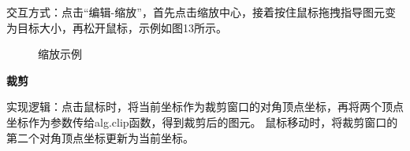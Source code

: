 \documentclass[a4paper,UTF8]{article}
\theoremstyle{definition}
\begin{document}
交互方式：点击“编辑-缩放”，首先点击缩放中心，接着按住鼠标拖拽指导图元变为目标大小，再松开鼠标，示例如图13所示。
\begin{figure}[H]
    \centering
        \caption{缩放示例}
        \label{fig:1}
\end{figure}

\textbf{裁剪}

实现逻辑：点击鼠标时，将当前坐标作为裁剪窗口的对角顶点坐标，再将两个顶点坐标作为参数传给alg.clip函数，得到裁剪后的图元。
鼠标移动时，将裁剪窗口的第二个对角顶点坐标更新为当前坐标。
\end{document}
